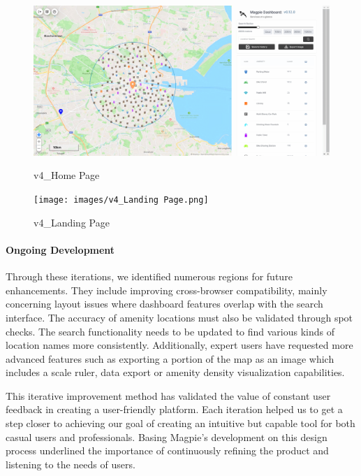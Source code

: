 \begin{figure}[htbp]
    \centering
    \begin{minipage}{0.48\textwidth}
        \centering
        \includegraphics[width=\textwidth]{images/v4_Home.png}
        \caption{v4\_Home Page}
        \label{fig:v4_Home Page}
    \end{minipage}
    \hfill
    \begin{minipage}{0.48\textwidth}
        \centering
        \texttt{[image: images/v4\_Landing Page.png]}
        \caption{v4\_Landing Page}
        \label{fig:v4_Landing Page}
    \end{minipage}
\end{figure}

\paragraph{Ongoing Development}

Through these iterations, we identified numerous regions for future enhancements.
They include improving cross-browser compatibility, mainly concerning layout
issues where dashboard features overlap with the search interface. 
The accuracy of amenity locations must also be validated through spot checks.
The search functionality needs to be updated to find various kinds of location 
names more consistently. Additionally, expert users have requested more advanced 
features such as exporting a portion of the map as an image which includes a scale 
ruler, data export or amenity density visualization capabilities.

This iterative improvement method has validated the value of constant user
feedback in creating a user-friendly platform. Each iteration helped us to
get a step closer to achieving our goal of creating an intuitive but capable
tool for both casual users and professionals. Basing Magpie's development on this 
design process underlined the importance of continuously refining the product and
listening to the needs of users.
